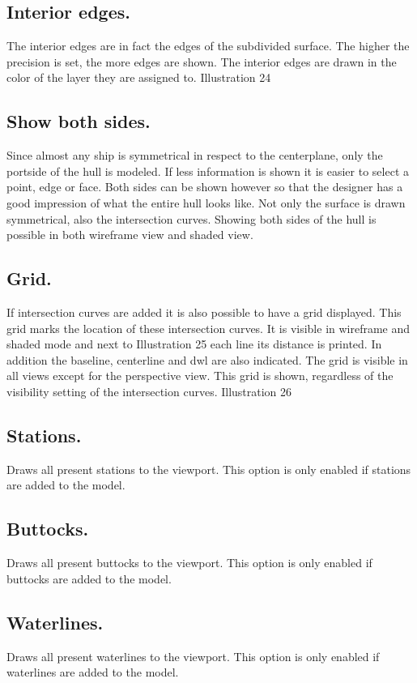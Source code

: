 \documentclass[12pt]{article}
\begin{document}
\subsection{Interior edges.} \label{interior-edges}
The interior edges are in fact the edges of the
subdivided surface. The higher the precision is
set, the more edges are shown. The interior
edges are drawn in the color of the layer they
are assigned to.
Illustration 24

\subsection{Show both sides.}
Since almost any ship is symmetrical in respect to the centerplane, only the portside of the hull is
modeled. If less information is shown it is easier to select a point,
edge or face. Both sides can be shown however so that the
designer has a good impression of what the entire hull looks like.
Not only the surface is drawn symmetrical, also the intersection
curves. Showing both sides of the hull is possible in both
wireframe view and shaded view.

\subsection{Grid.}
If intersection curves are added it is also possible to have a grid
displayed. This grid marks the location of these intersection
curves. It is visible in wireframe and shaded mode and next to
Illustration 25
each line its distance is printed. In addition the baseline, centerline
and dwl are also indicated. The grid is visible in all views except for the perspective view. This grid
is shown, regardless of the visibility setting of the intersection curves.
Illustration 26

\subsection{Stations.}
Draws all present stations to the viewport. This option is only enabled if stations are added to the
model.

\subsection{Buttocks.}
Draws all present buttocks to the viewport. This option is only enabled if buttocks are added to the
model.

\subsection{Waterlines.}
Draws all present waterlines to the viewport. This option is only enabled if waterlines are added to
the model.
\end{document}
